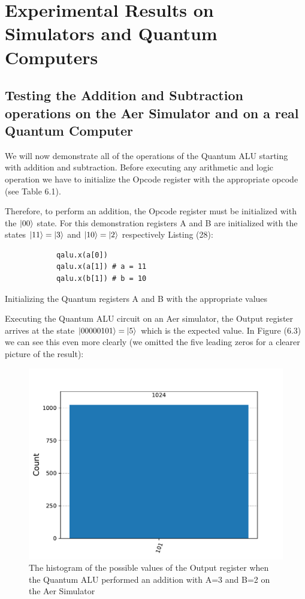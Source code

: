 \newpage
\section{Experimental Results on Simulators and Quantum Computers}
\subsection{Testing the Addition and Subtraction operations on the Aer Simulator and on a real Quantum Computer}

We will now demonstrate all of the operations of the Quantum ALU starting with addition and subtraction. Before executing any arithmetic and logic 
operation we have to initialize the Opcode register with the appropriate opcode (see Table 6.1).

Therefore, to perform an addition, the Opcode register must be initialized with the $\ket{00}$ state. For this demonstration
registers A and B are initialized with the states $\ket{11}=\ket{3}$ and $\ket{10}=\ket{2}$ respectively Listing (28):

\begin{listing}[!ht]
        \begin{verbatim}
            qalu.x(a[0])
            qalu.x(a[1]) # a = 11
            qalu.x(b[1]) # b = 10
        \end{verbatim}
        \caption{Initializing the Quantum registers A and B with the appropriate values}
        \label{ls:6_init_add}
\end{listing}

Executing the Quantum ALU circuit on an Aer simulator, the Output register arrives at the state $\ket{00000101}=\ket{5}$ which is the expected value.
In Figure (6.3) we can see this even more clearly (we omitted the five leading zeros for a clearer picture of the result):

\begin{figure}[!ht]
        \centering
        \includegraphics[scale=0.7]{images/6_Complete_System/adder_subtractor_aer_result.pdf}
        \caption{The histogram of the possible values of the Output register when the Quantum ALU performed an addition with A=3 and B=2 on the Aer Simulator}
\end{figure}

